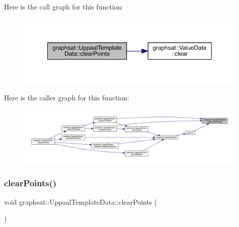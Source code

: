 Here is the call graph for this function\+:
\nopagebreak
\begin{figure}[H]
\begin{center}
\leavevmode
\includegraphics[width=350pt]{classgraphsat_1_1_uppaal_template_data_af0588cce20cfbd447cddadabebc2b2a9_cgraph}
\end{center}
\end{figure}
Here is the caller graph for this function\+:
\nopagebreak
\begin{figure}[H]
\begin{center}
\leavevmode
\includegraphics[width=350pt]{classgraphsat_1_1_uppaal_template_data_af0588cce20cfbd447cddadabebc2b2a9_icgraph}
\end{center}
\end{figure}
\mbox{\label{classgraphsat_1_1_uppaal_template_data_a308dd0e29dc2eb35ec12c26597f6929b}} 
\subsubsection{\texorpdfstring{clearPoints()}{clearPoints()}\hspace{0.1cm}{\footnotesize\ttfamily [2/2]}}
{\footnotesize\ttfamily void graphsat\+::\+Uppaal\+Template\+Data\+::clear\+Points (\begin{DoxyParamCaption}{ }\end{DoxyParamCaption})\hspace{0.3cm}{\ttfamily [inline]}}

